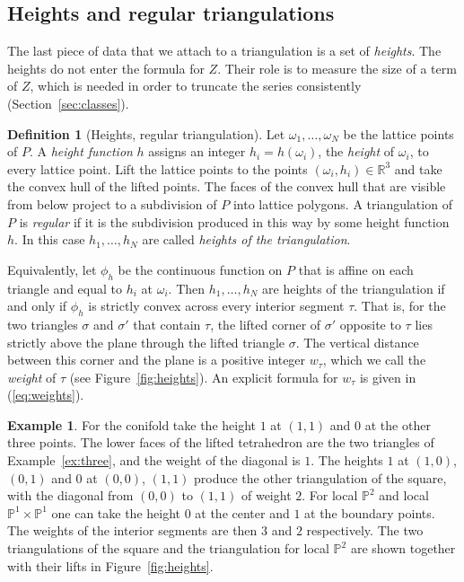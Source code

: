 \documentclass[11pt]{article}
\theoremstyle{plain}
\theoremstyle{definition}
\newtheorem{definition}[theorem]{Definition}
\newtheorem{example}[theorem]{Example}
\theoremstyle{remark}
\newcommand{\R}{\mathbb{R}}
\newcommand{\PP}{\mathbb{P}}
\begin{document}
\subsection{Heights and regular triangulations}\label{ssec:heights}

The last piece of data that we attach to a triangulation is a set of \textit{heights}. The
heights do not enter the formula for $Z$. Their role is to measure the size of a term of $Z$,
which is needed in order to truncate the series consistently (Section~\ref{sec:classes}).

\begin{definition}[Heights, regular triangulation]\label{def:heights}
Let $\omega_1,\ldots,\omega_N$ be the lattice points of $P$. A \textit{height function} $h$
assigns an integer $h_i=h(\omega_i)$, the \textit{height} of $\omega_i$, to every lattice
point. Lift the lattice points to the points $(\omega_i,h_i)\in\R^3$ and take the convex hull of
the lifted points. The faces of the convex hull that are visible from below project to a
subdivision of $P$ into lattice polygons. A triangulation of $P$ is \textit{regular} if it is
the subdivision produced in this way by some height function $h$. In this case
$h_1,\ldots,h_N$ are called \textit{heights of the triangulation}.
\end{definition}

Equivalently, let $\phi_h$ be the continuous function on $P$ that is affine on each triangle
and equal to $h_i$ at $\omega_i$. Then $h_1,\ldots,h_N$ are heights of the triangulation if and
only if $\phi_h$ is strictly convex across every interior segment $\tau$. That is, for the two
triangles $\sigma$ and $\sigma'$ that contain $\tau$, the lifted corner of $\sigma'$ opposite to
$\tau$ lies strictly above the plane through the lifted triangle $\sigma$. The vertical distance
between this corner and the plane is a positive integer $w_\tau$, which we call the
\textit{weight} of $\tau$ (see Figure~\ref{fig:heights}). An explicit formula for $w_\tau$ is
given in (\ref{eq:weights}).

\begin{example}\label{ex:heights}
For the conifold take the height $1$ at $(1,1)$ and $0$ at the other three points. The lower
faces of the lifted tetrahedron are the two triangles of Example~\ref{ex:three}, and the weight
of the diagonal is $1$. The heights $1$ at $(1,0)$, $(0,1)$ and $0$ at $(0,0)$, $(1,1)$ produce
the other triangulation of the square, with the diagonal from $(0,0)$ to $(1,1)$ of weight
$2$. For local
$\PP^2$ and local $\PP^1\times\PP^1$ one can take the height $0$ at the center and $1$ at the
boundary points. The weights of the interior segments are then $3$ and $2$ respectively. The
two triangulations of the square and the triangulation for local $\PP^2$ are shown together with
their lifts in Figure~\ref{fig:heights}.
\end{example}
\end{document}
